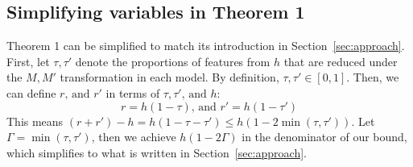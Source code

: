 

\subsection{Simplifying variables in Theorem 1}
Theorem 1 can be simplified to match its introduction in Section~\ref{sec:approach}. First, let $\tau,\tau'$ denote the proportions of features from $h$ that are reduced under the $M,M'$ transformation in each model. By definition, $\tau,\tau'\in[0,1]$. Then, we can define $r\text{, and }r'$ in terms of $\tau,\tau'\text{, and }h$:
\begin{equation*}
    r=h(1-\tau)\text{, and }r'=h(1-\tau')
\end{equation*}
This means $(r+r')-h=h(1-\tau-\tau')\leq h(1-2\min(\tau,\tau'))$. Let $\Gamma=\min(\tau,\tau')$, then we achieve $h(1-2\Gamma)$ in the denominator of our bound, which simplifies to what is written in Section~\ref{sec:approach}.




